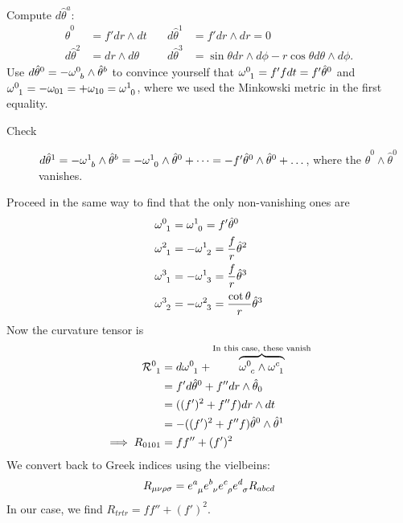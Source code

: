 Compute $d\hat \theta^a$:
\begin{align}
  \hat \theta^0 &= f' dr \wedge dt \quad & d\hat\theta^1 &= f' dr \wedge dr = 0 \\
  d \hat\theta^2 &= dr \wedge d\theta \quad &d \hat\theta^3 &= \sin \theta dr \wedge d\phi - r \cos \theta d \theta \wedge d\phi.
\end{align}
Use $d \hat\theta^0 = - \omega \indices{^0_b} \wedge \hat\theta^b$ to convince yourself that $\omega \indices{^0_1} = f' f dt = f' \hat\theta^0$ and $\omega \indices{^0_1} = -\omega_{01} = + \omega_{10} = \omega \indices{^1_0}$, where we used the Minkowski metric in the first equality.
\begin{description}
  \item[Check] $d\hat\theta^1 = - \omega \indices{^1_b} \wedge \hat\theta^b = -\omega \indices{^1_0} \wedge \hat\theta^0 + \dots = -f' \hat\theta^0 \wedge \hat\theta^0 + \dots$, where the $\hat\theta^0 \wedge \hat\theta^0$ vanishes. \checkmark
\end{description}
Proceed in the same way to find that the only non-vanishing ones are
\begin{align}
  \omega \indices{^0_1} &= \omega \indices{^1_0} = f' \hat\theta^0 \\
  \omega \indices{^2_1}&= - \omega \indices{^1_2} = \frac{f}{r} \hat\theta^2 \\
  \omega \indices{^3_1} &= - \omega \indices{^1_3} = \frac{f}{r} \hat\theta^3 \\
  \omega \indices{^3_2} &= - \omega \indices{^2_3} = \frac{\cot \theta}{r} \hat\theta^3
\end{align}
Now the curvature tensor is
\begin{align}
  \mathcal{R} \indices{^0_1} &= d \omega \indices{^0_1} + \overbrace{\omega \indices{^0_c} \wedge \omega \indices{^c_1}}^{\text{In this case, these vanish}} \\
			     &= f' d\hat\theta^0 + f'' dr \wedge \hat\theta_0 \\
			     &= ((f')^2 + f'' f) dr \wedge dt \\
			     &= -((f')^2 + f'' f) \hat\theta^0 \wedge \hat\theta^1 \\
  \implies R_{0101} &= ff'' + (f')^2
\end{align}
We convert back to Greek indices using the vielbeins:
\begin{equation}
  R_{\mu\nu\rho\sigma}= e \indices{^a_\mu} e \indices{^b_{\nu}} e \indices{^c_\rho} e \indices{^d_\sigma} R_{abcd}
\end{equation}
In our case, we find $R_{trtr} = ff'' + (f')^2$.
